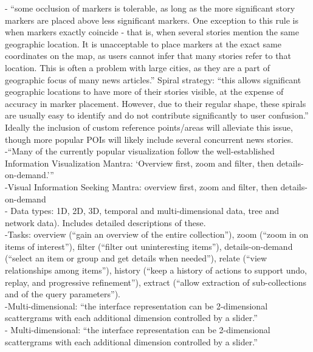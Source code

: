 -{\color{orange} “some occlusion of markers is tolerable, as long as the more significant story markers are placed above less significant markers. One exception to this rule is when markers exactly coincide - that is, when several stories mention the same geographic location. It is unacceptable to place markers at the exact same coordinates on the map, as users cannot infer that many stories refer to that location. This is often a problem with large cities, as they are a part of geographic focus of many news articles.” Spiral strategy: “this allows significant geographic locations to have more of their stories visible, at the expense of accuracy in marker placement. However, due to their regular shape, these spirals are usually easy to identify and do not contribute significantly to user confusion.”}{\color{purple} Ideally the inclusion of custom reference points/areas will alleviate this issue, though more popular POIs will likely include several concurrent news stories.}\cite{Teitler2008}\\
-{\color{orange}“Many of the currently popular visualization follow the well-established Information Visualization Mantra: ‘Overview first, zoom and filter, then details-on-demand.’”\cite{Shneiderman2020}}\\
-{\color{orange}Visual Information Seeking Mantra: overview first, zoom and filter, then details-on-demand\cite{Shneiderman1996}}\\
-{\color{orange} Data types: 1D, 2D, 3D, temporal and multi-dimensional data, tree and network data). Includes detailed descriptions of these.\cite{Shneiderman1996}}\\
-{\color{orange}Tasks: overview (“gain an overview of the entire collection”), zoom (“zoom in on items of interest”), filter (“filter out uninteresting items”), details-on-demand (“select an item or group and get details when needed”), relate (“view relationships among items”), history (“keep a history of actions to support undo, replay, and progressive refinement”), extract (“allow extraction of sub-collections and of the query parameters”).\cite{Shneiderman1996}}\\
-{\color{orange}Multi-dimensional: “the interface representation can be 2-dimensional scattergrams with each additional dimension controlled by a slider.”	\cite{Shneiderman1996}}\\
-{\color{orange} Multi-dimensional: “the interface representation can be 2-dimensional scattergrams with each additional dimension controlled by a slider.”\cite{Shneiderman1996}}\\

